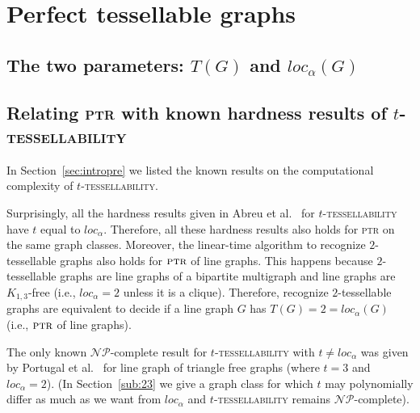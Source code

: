 \documentclass[9pt]{entcs} \usepackage{entcsmacro}
\begin{document}
\section{Perfect tessellable graphs}\label{sec:npc}
\subsection{The two parameters: $T(G)$ and $loc_\alpha(G)$}
\label{sub:31}

\subsection{Relating \textsc{ptr} with known hardness results of \textsc{$t$-tessellability}}
\label{sub:32}

In Section~\ref{sec:intropre} we listed the known results on the computational complexity of \textsc{$t$-tessellability}.

Surprisingly, all the hardness results given in Abreu et al.~\cite{ArLatin} for \textsc{$t$-tessellability} have $t$ equal to $loc_\alpha$.
Therefore, all these hardness results also holds for \textsc{ptr} on the same graph classes.
Moreover, the linear-time algorithm to recognize $2$-tessellable graphs also holds for $\textsc{ptr}$ of line graphs.
This happens because $2$-tessellable graphs are line graphs of a bipartite multigraph and line graphs are $K_{1,3}$-free (i.e., $loc_\alpha=2$ unless it is a clique).
Therefore, recognize $2$-tessellable graphs are equivalent to decide if a line graph $G$ has $T(G)=2=loc_\alpha(G)$ (i.e., $\textsc{ptr}$ of line graphs).

The only known $\mathcal{NP}$-complete result for \textsc{$t$-tessellability} with $t \neq loc_\alpha$ was given by Portugal et al.~\cite{ArCNMAC} for line graph of triangle free graphs (where $t = 3$ and $loc_\alpha=2$).
(In Section~\ref{sub:23} we give a graph class for which $t$ may polynomially differ as much as we want from $loc_\alpha$ and \textsc{$t$-tessellability} remains $\mathcal{NP}$-complete).
\end{document}
